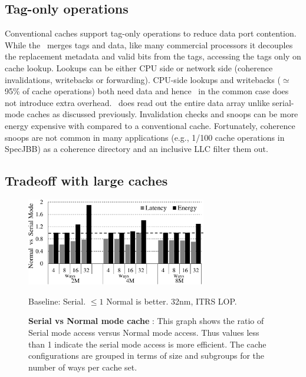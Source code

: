 \subsection{Tag-only operations}  

Conventional caches support tag-only operations to reduce data port contention. While the \AC\ merges tags and data, like many commercial processors it decouples the replacement metadata and valid bits from the tags, accessing the tags only on cache lookup. Lookups can be either CPU side or network side (coherence invalidations, writebacks or forwarding). CPU-side lookups and writebacks ($\simeq$ 95\% of cache operations) both need data and hence \AC\ in the common case does not introduce extra overhead. \AC\ does read out the entire data array unlike serial-mode caches as discussed previously. Invalidation checks and snoops can be more energy expensive with \AC{} compared to a conventional cache. Fortunately, coherence snoops are not common in many applications (e.g., 1/100 cache operations in SpecJBB) as a coherence directory and an inclusive LLC filter them out.


\subsection{Tradeoff with large caches} 
\label{sec:tradeoff_with_large_caches} %

\begin{figure}[h] 
\centering
\includegraphics[width=0.7\textwidth]{files/Plots/07-Serial_vs_Normal.pdf}

Baseline: Serial. $\leq1$ Normal is better.  32nm, ITRS  LOP. 
\caption[Serial vs. Normal - Latency and Energy]{\textbf{Serial vs Normal mode cache} : This graph shows the ratio of Serial mode access versus Normal mode access. Thus values less than 1 indicate the serial mode access is more efficient. The cache configurations are grouped in terms of size and subgroups for the number of ways per cache set. }
\label{fig:serial_normal_graph} 
\end{figure}

